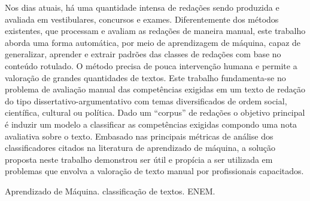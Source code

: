 \begin{resumo} 
  Nos dias atuais, há uma quantidade intensa de redações sendo produzida e 
  avaliada em vestibulares, concursos e exames. Diferentemente dos métodos 
  existentes, que processam e avaliam as redações de maneira manual, este 
  trabalho aborda uma forma automática, por meio de  aprendizagem de máquina, 
  capaz de generalizar, aprender e extrair padrões das classes de redações com 
  base no conteúdo rotulado. O método precisa de pouca intervenção humana e 
  permite a valoração de grandes quantidades de textos.  Este trabalho 
  fundamenta-se no problema de avaliação manual das competências exigidas em um 
  texto de redação do tipo dissertativo-argumentativo com temas diversificados 
  de ordem social, científica, cultural ou política. Dado um ``corpus'' de 
  redações o objetivo principal é induzir um modelo a classificar as 
  competências exigidas compondo uma nota avaliativa sobre o texto. Embasado 
  nas principais métricas de análise dos classificadores citados na literatura 
  de aprendizado de máquina, a solução proposta neste trabalho demonstrou ser 
  útil e propícia a ser utilizada em problemas que envolva a valoração de texto 
  manual por profissionais capacitados.
\end{resumo}

\begin{palavrachave}
 Aprendizado de Máquina. classificação de textos. ENEM.
\end{palavrachave}
